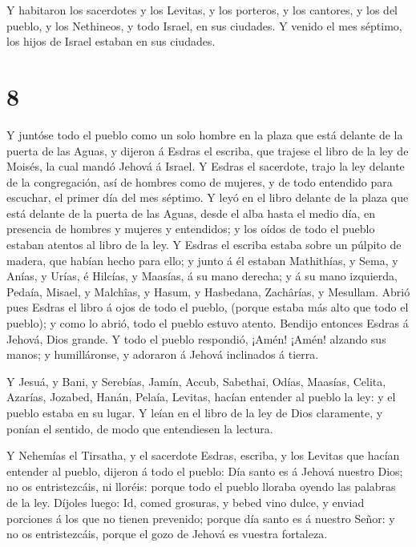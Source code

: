  Y habitaron los sacerdotes y los Levitas, y los porteros,
y los cantores, y los del pueblo, y los Nethineos, y todo Israel, en sus
ciudades. Y venido el mes séptimo, los hijos de Israel estaban en sus
ciudades.

\hypertarget{section-7}{%
\section{8}\label{section-7}}

 Y juntóse todo el pueblo como un solo hombre en la plaza
que está delante de la puerta de las Aguas, y dijeron á Esdras el
escriba, que trajese el libro de la ley de Moisés, la cual mandó Jehová
á Israel.  Y Esdras el sacerdote, trajo la ley delante de la
congregación, así de hombres como de mujeres, y de todo entendido para
escuchar, el primer día del mes séptimo.  Y leyó en el libro
delante de la plaza que está delante de la puerta de las Aguas, desde el
alba hasta el medio día, en presencia de hombres y mujeres y entendidos;
y los oídos de todo el pueblo estaban atentos al libro de la ley.
 Y Esdras el escriba estaba sobre un púlpito de madera, que
habían hecho para ello; y junto á él estaban Mathithías, y Sema, y
Anías, y Urías, é Hilcías, y Maasías, á su mano derecha; y á su mano
izquierda, Pedaía, Misael, y Malchîas, y Hasum, y Hasbedana, Zachârías,
y Mesullam.  Abrió pues Esdras el libro á ojos de todo el
pueblo, (porque estaba más alto que todo el pueblo); y como lo abrió,
todo el pueblo estuvo atento.  Bendijo entonces Esdras á
Jehová, Dios grande. Y todo el pueblo respondió, ¡Amén! ¡Amén! alzando
sus manos; y humilláronse, y adoraron á Jehová inclinados á tierra.

 Y Jesuá, y Bani, y Serebías, Jamín, Accub, Sabethai, Odías,
Maasías, Celita, Azarías, Jozabed, Hanán, Pelaía, Levitas, hacían
entender al pueblo la ley: y el pueblo estaba en su lugar. 
Y leían en el libro de la ley de Dios claramente, y ponían el sentido,
de modo que entendiesen la lectura.

 Y Nehemías el Tirsatha, y el sacerdote Esdras, escriba, y
los Levitas que hacían entender al pueblo, dijeron á todo el pueblo: Día
santo es á Jehová nuestro Dios; no os entristezcáis, ni lloréis: porque
todo el pueblo lloraba oyendo las palabras de la ley. 
Díjoles luego: Id, comed grosuras, y bebed vino dulce, y enviad
porciones á los que no tienen prevenido; porque día santo es á nuestro
Señor: y no os entristezcáis, porque el gozo de Jehová es vuestra
fortaleza.

